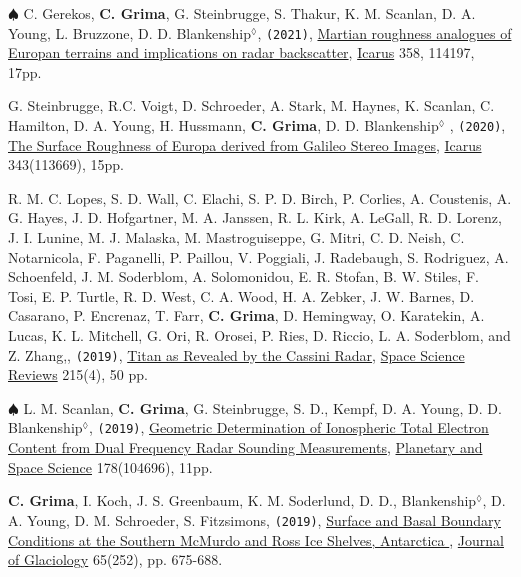 \begin{etaremune}
\item
  $\spadesuit$ C. Gerekos, \textbf{C. Grima}, G. Steinbrugge, S. Thakur, K. M. Scanlan, D. A. Young, L. Bruzzone, D. D. Blankenship$^\lozenge$, \texttt{(2021)}, \href{https://doi.org/10.1016/j.icarus.2020.114197}{Martian roughness analogues of Europan terrains and implications on radar backscatter}, \ul{Icarus} 358, 114197, 17pp.
  
\item
  G. Steinbrugge, R.C. Voigt, D. Schroeder, A. Stark, M. Haynes, K. Scanlan, C. Hamilton, D. A. Young, H. Hussmann, \textbf{C. Grima}, D. D. Blankenship$^\lozenge$ , \texttt{(2020)}, \href{https://www.sciencedirect.com/science/article/abs/pii/S0019103519301526}{The Surface Roughness of Europa derived from Galileo Stereo Images}, \ul{Icarus} 343(113669), 15pp.
  
\item
  R. M. C. Lopes, S. D. Wall, C. Elachi, S. P. D. Birch, P. Corlies, A. Coustenis, A. G. Hayes, J. D. Hofgartner, M. A. Janssen, R. L. Kirk, A. LeGall, R. D. Lorenz, J. I. Lunine, M. J. Malaska, M. Mastroguiseppe, G. Mitri, C. D. Neish, C. Notarnicola, F. Paganelli, P. Paillou, V. Poggiali, J. Radebaugh, S. Rodriguez, A. Schoenfeld, J. M. Soderblom, A. Solomonidou, E. R. Stofan, B. W. Stiles, F. Tosi, E. P. Turtle, R. D. West, C. A. Wood, H. A. Zebker, J. W. Barnes, D. Casarano, P. Encrenaz, T. Farr, \textbf{C. Grima}, D. Hemingway, O. Karatekin, A. Lucas, K. L. Mitchell, G. Ori, R. Orosei, P. Ries, D. Riccio, L. A. Soderblom, and Z. Zhang,, \texttt{(2019)}, \href{https://ui.adsabs.harvard.edu/abs/2019SSRv..215...33L/abstract}{Titan as Revealed by the Cassini Radar}, \ul{Space Science Reviews} 215(4), 50 pp.
  
\item
  $\spadesuit$ L. M. Scanlan, \textbf{C. Grima}, G. Steinbrugge, S. D., Kempf, D. A. Young, D. D. Blankenship$^\lozenge$, \texttt{(2019)}, \href{https://www.sciencedirect.com/science/article/pii/S0032063319300820}{Geometric Determination of Ionospheric Total Electron Content from Dual Frequency Radar Sounding Measurements}, \ul{Planetary and Space Science} 178(104696), 11pp.

\item
  \textbf{C. Grima}, I. Koch, J. S. Greenbaum, K. M. Soderlund, D. D., Blankenship$^\lozenge$, D. A. Young, D. M. Schroeder, S. Fitzsimons, \texttt{(2019)}, \href{https://www.cambridge.org/core/journals/journal-of-glaciology/article/surface-and-basal-boundary-conditions-at-the-southern-mcmurdo-and-ross-ice-shelves-antarctica/3ED3BFD465A3F6A5FC48342694F91EC5}{Surface and Basal Boundary Conditions at the Southern McMurdo and Ross Ice Shelves, Antarctica \aiOpenAccessSquare}, \ul{Journal of Glaciology} 65(252), pp. 675-688.


\end{etaremune}
